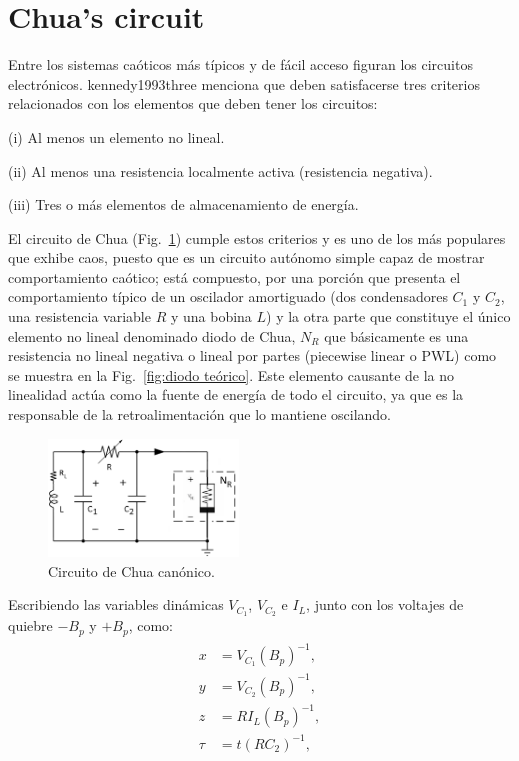 \documentclass[%
 reprint,
 amsmath,amssymb,
 aps,
]{revtex4-2}
\begin{document}

\section{Chua's circuit}
Entre los sistemas caóticos más típicos y de fácil acceso figuran los circuitos electrónicos. kennedy1993three menciona que deben satisfacerse tres criterios relacionados con los elementos que deben tener los circuitos: 

(i) Al menos un elemento no lineal.

(ii) Al menos una resistencia localmente activa (resistencia negativa). 

(iii) Tres o más elementos de almacenamiento de energía.

El circuito de Chua (Fig.~\ref{fig:circuito de Chua}) cumple estos criterios y es uno de los más populares que exhibe caos, puesto que es un circuito autónomo simple capaz de mostrar comportamiento caótico; está compuesto, por una porción que presenta el comportamiento típico de un oscilador amortiguado (dos condensadores $C_1$ y $C_2$, una resistencia variable $R$ y una bobina $L$) y la otra parte que constituye el único elemento no lineal denominado diodo de Chua, $N_R$ que básicamente es una resistencia no lineal negativa o lineal por partes (piecewise linear o PWL) como se muestra en la Fig.~\ref{fig:diodo teórico}. Este elemento causante de la no linealidad actúa como la fuente de energía de todo el circuito, ya que es la responsable de la retroalimentación que lo mantiene oscilando. 
\begin{figure}[h]
    \centering
    \includegraphics[width=0.45\textwidth]{Chua/circuitodechua.png}
    \caption{\label{fig:circuito de Chua} Circuito de Chua canónico.}
\end{figure}
Escribiendo las variables dinámicas $V_{C_1}$, $V_{C_2}$ e $I_L$, junto con los voltajes de quiebre $-B_{p}$ y $+B_{p}$, como:
\begin{eqnarray}
    \begin{aligned}
        x & = V_{C_1}(B_p)^{-1},\\
        y & = V_{C_2}(B_p)^{-1},\\ 
        z & = RI_L(B_p)^{-1},\\ 
        \tau & = t(RC_2)^{-1},
    \end{aligned}
\end{eqnarray}
\end{document}
